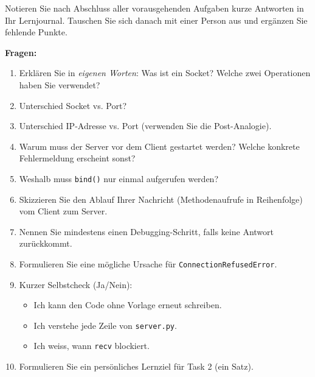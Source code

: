 \begin{myexercise}
    Notieren Sie nach Abschluss aller vorausgehenden Aufgaben kurze Antworten in Ihr Lernjournal. Tauschen Sie sich danach mit einer Person aus und ergänzen Sie fehlende Punkte.

    \textbf{Fragen:}
    \begin{enumerate}
        \item Erklären Sie in \emph{eigenen Worten}: Was ist ein Socket? Welche zwei Operationen haben Sie verwendet?
            \item Unterschied Socket vs. Port?
            \item Unterschied \gls{IP}-Adresse vs. Port (verwenden Sie die Post-Analogie).
            \item Warum muss der Server vor dem Client gestartet werden? Welche konkrete Fehlermeldung erscheint sonst?
            \item Weshalb muss \lstinline|bind()| nur einmal aufgerufen werden?
            \item Skizzieren Sie den Ablauf Ihrer Nachricht (Methodenaufrufe in Reihenfolge) vom Client zum Server.
            \item Nennen Sie mindestens einen Debugging-Schritt, falls keine Antwort zurückkommt.
            \item Formulieren Sie eine mögliche Ursache für \texttt{ConnectionRefusedError}.
            \item Kurzer Selbstcheck (Ja/Nein):
                  \begin{itemize}
                  \item Ich kann den Code ohne Vorlage erneut schreiben.
                  \item Ich verstehe jede Zeile von \texttt{server.py}.
                  \item Ich weiss, wann \texttt{recv} blockiert.
                  \end{itemize}
            \item Formulieren Sie ein persönliches Lernziel für Task 2 (ein Satz).
            \end{enumerate}


\end{myexercise}
